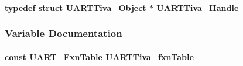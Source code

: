 \paragraph[{U\+A\+R\+T\+Tiva\+\_\+\+Handle}]{\setlength{\rightskip}{0pt plus 5cm}typedef struct {\bf U\+A\+R\+T\+Tiva\+\_\+\+Object} $\ast$ {\bf U\+A\+R\+T\+Tiva\+\_\+\+Handle}}\label{_u_a_r_t_tiva_8h_aaeecfa764f24fc2f566ca149dc091e78}


\subsubsection{Variable Documentation}
\paragraph[{U\+A\+R\+T\+Tiva\+\_\+fxn\+Table}]{\setlength{\rightskip}{0pt plus 5cm}const {\bf U\+A\+R\+T\+\_\+\+Fxn\+Table} U\+A\+R\+T\+Tiva\+\_\+fxn\+Table}\label{_u_a_r_t_tiva_8h_a4b0dd67d0f6e16ffba1aa4ba8cf1db6f}
